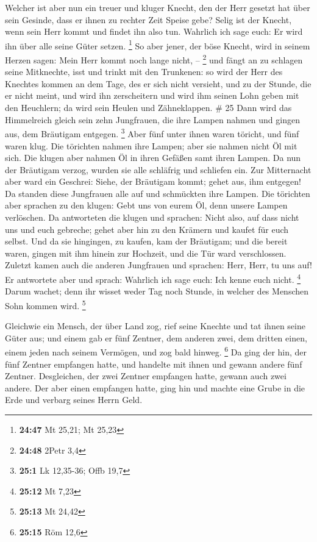  Welcher ist aber nun ein treuer und kluger Knecht, den der
Herr gesetzt hat über sein Gesinde, dass er ihnen zu rechter Zeit Speise
gebe?  Selig ist der Knecht, wenn sein Herr kommt und
findet ihn also tun.  Wahrlich ich sage euch: Er wird ihn
über alle seine Güter setzen. \footnote{\textbf{24:47} Mt 25,21; Mt
  25,23}  So aber jener, der böse Knecht, wird in seinem
Herzen sagen: Mein Herr kommt noch lange nicht, -- \footnote{\textbf{24:48}
  2Petr 3,4}  und fängt an zu schlagen seine Mitknechte,
isst und trinkt mit den Trunkenen:  so wird der Herr des
Knechtes kommen an dem Tage, des er sich nicht versieht, und zu der
Stunde, die er nicht meint,  und wird ihn zerscheitern und
wird ihm seinen Lohn geben mit den Heuchlern; da wird sein Heulen und
Zähneklappen. \# 25  Dann wird das Himmelreich gleich sein
zehn Jungfrauen, die ihre Lampen nahmen und gingen aus, dem Bräutigam
entgegen. \footnote{\textbf{25:1} Lk 12,35-36; Offb 19,7} 
Aber fünf unter ihnen waren töricht, und fünf waren klug. 
Die törichten nahmen ihre Lampen; aber sie nahmen nicht Öl mit sich.
 Die klugen aber nahmen Öl in ihren Gefäßen samt ihren
Lampen.  Da nun der Bräutigam verzog, wurden sie alle
schläfrig und schliefen ein.  Zur Mitternacht aber ward ein
Geschrei: Siehe, der Bräutigam kommt; gehet aus, ihm entgegen!
 Da standen diese Jungfrauen alle auf und schmückten ihre
Lampen.  Die törichten aber sprachen zu den klugen: Gebt uns
von eurem Öl, denn unsere Lampen verlöschen.  Da antworteten
die klugen und sprachen: Nicht also, auf dass nicht uns und euch
gebreche; gehet aber hin zu den Krämern und kaufet für euch selbst.
 Und da sie hingingen, zu kaufen, kam der Bräutigam; und
die bereit waren, gingen mit ihm hinein zur Hochzeit, und die Tür ward
verschlossen.  Zuletzt kamen auch die anderen Jungfrauen
und sprachen: Herr, Herr, tu uns auf!  Er antwortete aber
und sprach: Wahrlich ich sage euch: Ich kenne euch nicht. \footnote{\textbf{25:12}
  Mt 7,23}  Darum wachet; denn ihr wisset weder Tag noch
Stunde, in welcher des Menschen Sohn kommen wird. \footnote{\textbf{25:13}
  Mt 24,42}

 Gleichwie ein Mensch, der über Land zog, rief seine
Knechte und tat ihnen seine Güter aus;  und einem gab er
fünf Zentner, dem anderen zwei, dem dritten einen, einem jeden nach
seinem Vermögen, und zog bald hinweg. \footnote{\textbf{25:15} Röm 12,6}
 Da ging der hin, der fünf Zentner empfangen hatte, und
handelte mit ihnen und gewann andere fünf Zentner. 
Desgleichen, der zwei Zentner empfangen hatte, gewann auch zwei andere.
 Der aber einen empfangen hatte, ging hin und machte eine
Grube in die Erde und verbarg seines Herrn Geld.

